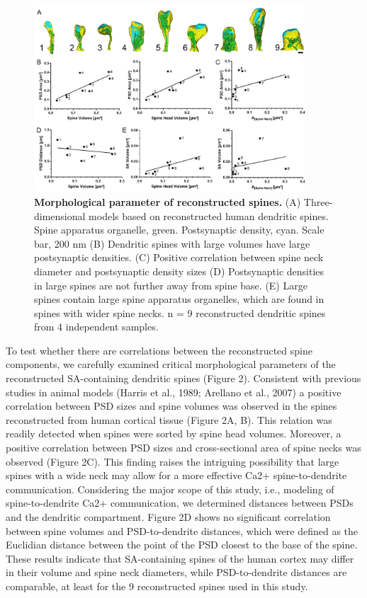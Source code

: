 \documentclass[fleqn,12pt]{wlscirep}
\begin{document}
\begin{figure}[h!]
\centering
\includegraphics[width=0.9\textwidth]{images/figure2.png}
\caption{{\small\textbf{ Morphological parameter of reconstructed spines.} (A) Three-dimensional models based on reconstructed human dendritic spines. Spine apparatus organelle, green. Postsynaptic density, cyan. Scale bar, 200 nm (B) Dendritic spines with large volumes have large postsynaptic densities. (C) Positive correlation between spine neck diameter and postsynaptic density sizes (D) Postsynaptic densities in large spines are not further away from spine base. (E) Large spines contain large spine apparatus organelles, which are found in spines with wider spine necks. n = 9 reconstructed dendritic spines from 4 independent samples.}}
\end{figure}

To test whether there are correlations between the reconstructed spine components, we carefully examined critical morphological parameters of the reconstructed SA-containing dendritic spines (Figure 2). Consistent with previous studies in animal models (Harris et al., 1989; Arellano et al., 2007) a positive correlation between PSD sizes and spine volumes was observed in the spines reconstructed from human cortical tissue (Figure 2A, B). This relation was readily detected when spines were sorted by spine head volumes. Moreover, a positive correlation between PSD sizes and cross-sectional area of spine necks was observed (Figure 2C). This finding raises the intriguing possibility that large spines with a wide neck may allow for a more effective Ca2+ spine-to-dendrite communication.
Considering the major scope of this study, i.e., modeling of spine-to-dendrite Ca2+ communication, we determined distances between PSDs and the dendritic compartment. Figure 2D shows no significant correlation between spine volumes and PSD-to-dendrite distances, which were defined as the Euclidian distance between the point of the PSD closest to the base of the spine. These results indicate that SA-containing spines of the human cortex may differ in their volume and spine neck diameters, while PSD-to-dendrite distances are comparable, at least for the 9 reconstructed spines used in this study.
\end{document}
